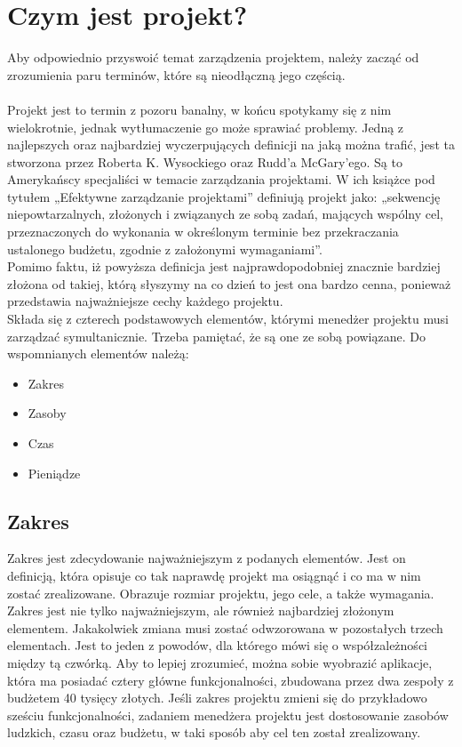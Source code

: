 \documentclass[oneside,polski,logo]{amuthesis}
\begin{document}
\section{Czym jest projekt?}
Aby odpowiednio przyswoić temat zarządzenia projektem, należy zacząć od zrozumienia paru terminów,  które są nieodłączną jego częścią. \\ \\
Projekt jest to termin z pozoru banalny, w końcu spotykamy się z nim wielokrotnie, jednak wytłumaczenie go może sprawiać problemy. Jedną z najlepszych oraz najbardziej wyczerpujących definicji na jaką można trafić, jest ta stworzona przez Roberta K. Wysockiego oraz Rudd’a McGary'ego. Są to Amerykańscy specjaliści w temacie zarządzania projektami. W ich książce pod tytułem „Efektywne zarządzanie projektami” definiują projekt jako: „sekwencję niepowtarzalnych, złożonych i związanych ze sobą zadań, mających wspólny cel, przeznaczonych do wykonania w określonym terminie bez przekraczania ustalonego budżetu, zgodnie z założonymi wymaganiami”. \cite{projekt} \\

Pomimo faktu, iż powyższa definicja jest najprawdopodobniej znacznie bardziej złożona od takiej, którą słyszymy na co dzień to jest ona bardzo cenna, ponieważ przedstawia najważniejsze cechy każdego projektu.\cite{projekt2}\\

Składa się z czterech podstawowych elementów, którymi menedżer projektu musi zarządzać symultanicznie. Trzeba pamiętać, że są one ze sobą powiązane\cite{projekt3}. Do wspomnianych elementów należą: 
\begin{itemize}
	\item Zakres
	\item Zasoby
	\item Czas
	\item Pieniądze
\end{itemize}

\subsection {Zakres}
Zakres jest zdecydowanie najważniejszym z podanych elementów. Jest on definicją, która opisuje co tak naprawdę projekt ma osiągnąć i co ma w nim zostać zrealizowane. Obrazuje rozmiar projektu, jego cele, a także wymagania. Zakres jest nie tylko najważniejszym, ale również najbardziej złożonym elementem. Jakakolwiek zmiana musi zostać odwzorowana w pozostałych trzech elementach. Jest to jeden z powodów, dla którego mówi się o współzależności między tą czwórką. Aby to lepiej zrozumieć, można sobie wyobrazić aplikacje, która ma posiadać cztery główne funkcjonalności, zbudowana przez dwa zespoły z budżetem 40 tysięcy złotych. Jeśli zakres projektu zmieni się do przykładowo sześciu funkcjonalności, zadaniem menedżera projektu jest dostosowanie zasobów ludzkich, czasu oraz budżetu, w taki sposób aby cel ten został zrealizowany. \cite{zarzadzanie8}
\end{document}
